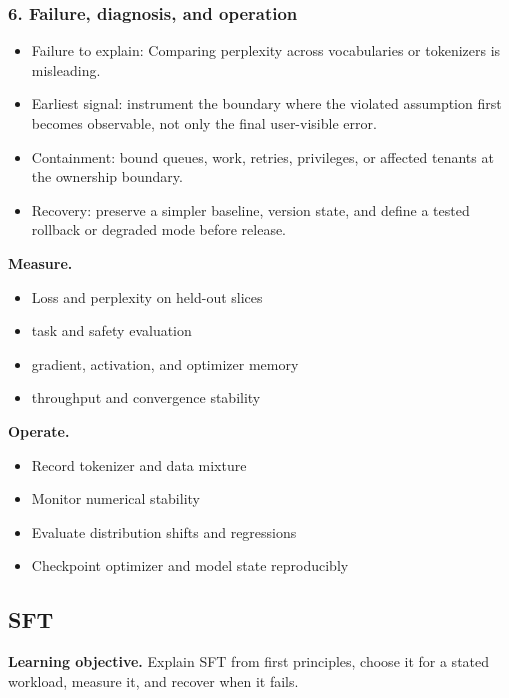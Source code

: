 \subsubsection*{6. Failure, diagnosis, and operation}
\begin{itemize}
\item Failure to explain: Comparing perplexity across vocabularies or tokenizers is misleading.
\item Earliest signal: instrument the boundary where the violated assumption first becomes observable, not only the final user-visible error.
\item Containment: bound queues, work, retries, privileges, or affected tenants at the ownership boundary.
\item Recovery: preserve a simpler baseline, version state, and define a tested rollback or degraded mode before release.
\end{itemize}
\textbf{Measure.}\begin{itemize}
\item Loss and perplexity on held-out slices
\item task and safety evaluation
\item gradient, activation, and optimizer memory
\item throughput and convergence stability
\end{itemize}
\textbf{Operate.}\begin{itemize}
\item Record tokenizer and data mixture
\item Monitor numerical stability
\item Evaluate distribution shifts and regressions
\item Checkpoint optimizer and model state reproducibly
\end{itemize}
\subsection{SFT}
\textbf{Learning objective.} Explain SFT from first principles, choose it for a stated workload, measure it, and recover when it fails.
